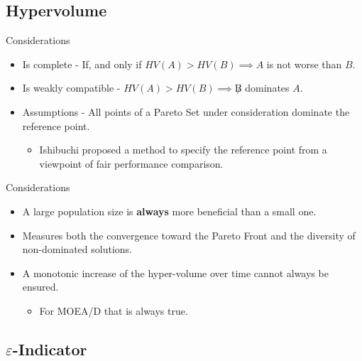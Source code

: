 \documentclass[ignorenonframetext,]{beamer}
\providecommand{\tightlist}{%
  \setlength{\itemsep}{0pt}\setlength{\parskip}{0pt}}
\begin{document}
\subsection{Hypervolume}\label{hypervolume}

\begin{frame}{Considerations}

\begin{itemize}
\tightlist
\item
  Is complete - If, and only if \(HV(A) > HV(B) \implies A\) is not
  worse than \(B\).
\item
  Is weakly compatible - \(HV(A) > HV(B) \implies\not B\) dominates
  \(A\).
\item
  Assumptions - All points of a Pareto Set under consideration dominate
  the reference point.

  \begin{itemize}
  \tightlist
  \item
    Ishibuchi \citet{ishibuchi2018specify} proposed a method to specify
    the reference point from a viewpoint of fair performance comparison.
  \end{itemize}
\end{itemize}

\end{frame}

\begin{frame}{Considerations}

\begin{itemize}
\tightlist
\item
  A large population size is \textbf{always} more beneficial than a
  small one.
\item
  Measures both the convergence toward the Pareto Front and the
  diversity of non-dominated solutions.
\item
  A monotonic increase of the hyper-volume over time cannot always be
  ensured.

  \begin{itemize}
  \tightlist
  \item
    For MOEA/D that is always true.
  \end{itemize}
\end{itemize}

\end{frame}

\subsection{\texorpdfstring{\(\varepsilon\)-Indicator}{\textbackslash{}varepsilon-Indicator}}\label{varepsilon-indicator}
\end{document}
